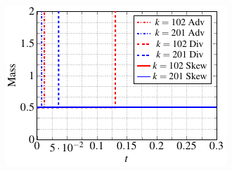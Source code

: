 \begin{figure}
  \centering
  \begin{subfigure}[]{0.48\linewidth}
            \includegraphics[scale=1]{Figures/paper-figure8.pdf}

\end{subfigure}
\end{figure}
